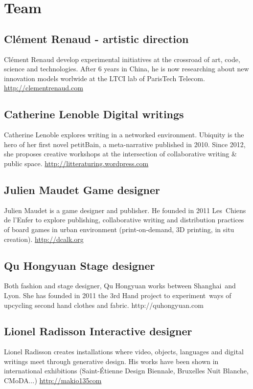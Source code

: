 \section{Team}

\subsection{Cl\'ement Renaud - artistic direction}
Cl\'ement Renaud develop experimental initiatives at the crossroad of
art, code, science and technologies. After 6 years in China, he is now
researching about new innovation models worlwide at the LTCI lab of
ParisTech Telecom.
\href{http://clementrenaud.com/}{http://clementrenaud.com}


\subsection{Catherine Lenoble Digital writings}
Catherine Lenoble explores writing in a networked environment. Ubiquity
is the hero of her first novel petitBain, a meta-narrative published in
2010. Since 2012, she proposes creative workshops at the intersection
of collaborative writing \& public space.
\href{http://litteraturing.wordpress.com/}{http://litteraturing.wordpress.com}


\subsection{Julien Maudet Game designer
}Julien Maudet is a game designer and publisher. He founded in 2011
Les~Chiens de l{\textquoteright}Enfer to explore publishing,
collaborative writing and distribution practices of board games in
urban environment (print-on-demand, 3D printing, in situ
creation).
\href{http://dcalk.org/}{http://dcalk.org}

\subsection{Qu Hongyuan Stage designer
}Both fashion and stage designer, Qu Hongyuan works between Shanghai~and
Lyon. She has founded in 2011 the 3rd Hand project to experiment~ways
of upcycling second hand clothes and fabric.
http://quhongyuan.com

\subsection{Lionel Radisson Interactive designer}
Lionel Radisson creates installations where video, objects, languages
and digital writings meet through generative design. His works have
been shown in international exhibitions (Saint-\'Etienne Design
Biennale, Bruxelles Nuit Blanche, CMoDA...)
\href{http://makio135com/}{http://makio135com}


